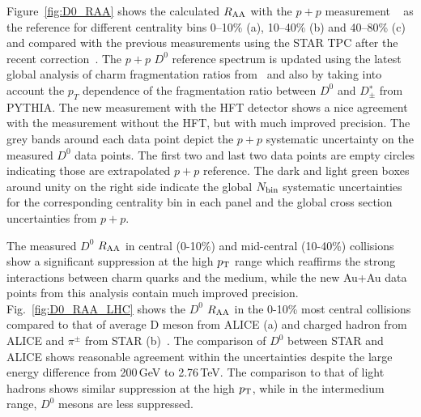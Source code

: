 \documentclass[%
 reprint,	
 amsmath,amssymb,
 aps,
 prc,
]{revtex4-1}
\begin{document}
Figure~\ref{fig:D0_RAA} shows the calculated $R_{\rm AA}$ with the $p+p$ measurement ~\cite{Star_D_pp} as the reference for different centrality bins 0--10\% (a), 10--40\% (b) and 40--80\% (c) and compared with the previous measurements using the STAR TPC after the recent correction~\cite{Star_D_RAA_corr}. The $p+p$ $D^0$ reference spectrum is updated using the latest global analysis of charm fragmentation ratios from~\cite{charm_frag} and also by taking into account the $p_T$ dependence of the fragmentation ratio between $D^0$ and $D^∗_\pm$ from PYTHIA. The new measurement with the HFT detector shows a nice agreement with the measurement without the HFT, but with much improved precision. The grey bands around each data point depict the $p+p$ systematic uncertainty on the measured $D^0$ data points. The first two and last two data points are empty circles indicating those are extrapolated $p+p$ reference. The dark and light green boxes around unity on the right side indicate the global $N_{\rm bin}$ systematic uncertainties for the corresponding centrality bin in each panel and the global cross section uncertainties from $p+p$.

The measured $D^0$ $R_{\rm AA}$ in central (0-10\%) and mid-central (10-40\%) collisions show a significant suppression at the high $p_{\rm T}$ range which reaffirms the strong interactions between charm quarks and the medium, while the new Au+Au data points from this analysis contain much improved precision. Fig.~\ref{fig:D0_RAA_LHC} shows the $D^0$ $R_{\rm AA}$ in the 0-10\% most central collisions compared to that of average D meson from ALICE (a) and charged hadron from ALICE and $\pi^{\pm}$ from STAR (b)~\cite{Alice_D_RAA_2,Alice_hadron_RAA,PhenixPi0}. The comparison of $D^0$ between STAR and ALICE shows reasonable agreement within the uncertainties despite the large energy difference from 200\,GeV to 2.76\,TeV. The comparison to that of light hadrons shows similar suppression at the high $p_{\rm T}$, while in the intermedium range, $D^0$ mesons are less suppressed.
\end{document}
